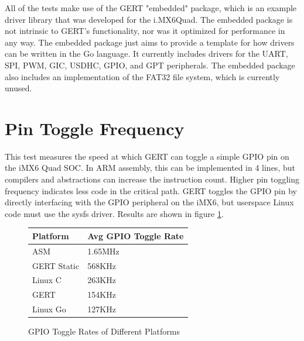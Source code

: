 All of the tests make use of the GERT "embedded" package, which is an example
driver library that was developed for the i.MX6Quad. The embedded package is not intrinsic to GERT's
functionality, nor was it optimized for performance in any way. The embedded package
just aims to provide a template for how drivers can be written in the Go language.
It currently includes drivers for the UART, SPI, PWM, GIC, USDHC, GPIO, and GPT peripherals.
The embedded package also includes an implementation of the FAT32 file system, which is 
currently unused.


\section{Pin Toggle Frequency}\label{sec:pin_toggle}
This test measures the speed at which GERT can toggle a simple GPIO pin on
the iMX6 Quad SOC. In ARM assembly, this can be implemented in 4 lines, but compilers and 
abstractions can increase the instruction count. Higher pin
toggling frequency indicates less code in the critical path.
GERT toggles the GPIO pin by directly interfacing with the GPIO
peripheral on the iMX6, but userspace Linux code must use the
sysfs driver.
Results are shown in figure \ref{fig:toggle}.


\begin{figure} [h]
\begin{center}
  \begin{tabular}{ | l | l |}
    \hline
    Platform & Avg GPIO Toggle Rate \\ \hline
    ASM & 1.65MHz \\ \hline
    GERT Static & 568KHz \\ \hline
    Linux C & 263KHz \\ \hline
    GERT & 154KHz \\ \hline
    Linux Go & 127KHz \\
    \hline
  \end{tabular}
\end{center}
  \caption{GPIO Toggle Rates of Different Platforms}  \label{fig:toggle}
\end{figure}

